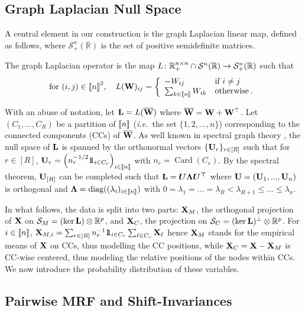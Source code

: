 \subsection{Graph Laplacian Null Space}\label{sec:laplacian_prop}
A central element in our construction is the graph Laplacian linear map, defined as follows, where $\mathcal{S}^n_+(\mathbb{R})$ is the set of positive semidefinite matrices.
\begin{definition}\label{graph_laplacian}
The graph Laplacian operator is the map $L \colon \mathbb{R}_+^{n \times n} \cap \mathcal{S}^n(\mathbb{R}) \to \mathcal{S}^n_+(\mathbb{R})$ such that
$$\text{for } (i,j) \in {[\![n]\!]}^2, \quad L(\mathbf{W})_{ij} = \left\{
\begin{array}{ll}
    - W_{ij} & \text{if } i \neq j \\
    \sum_{k \in {[\![n]\!]}} W_{ik} & \text{otherwise} \:.
\end{array} 
\right. $$
\end{definition}
With an abuse of notation, let $\mathbf{L} = L(\overline{\mathbf{W}})$ where $\overline{\mathbf{W}} = \mathbf{W} + \mathbf{W}^\top$. Let $(C_1,...,C_{R})$ be a partition of ${[\![n]\!]}$ (\textit{i.e.}\ the set $\{1,2,...,n\}$) corresponding to the connected components (CCs) of $\overline{\mathbf{W}}$. As well known in spectral graph theory \citep{Chung97}, the null space of $\mathbf{L}$ is spanned by the orthonormal vectors $\{\mathbf{U}_{r}\}_{r \in [R]}$ such that for $r \in [R]$,
$\mathbf{U}_{r} = \left(n_r^{-1/2} 1\!\!1_{i \in C_r}\right)_{i \in {[\![n]\!]}}$ with $n_r = \operatorname{Card}(C_r)$. By the spectral theorem, $\mathbf{U}_{[R]}$ can be completed such that $\mathbf{L} = \bm{U \Lambda U^\top}$ where $\mathbf{U} = (\mathbf{U}_1, ..., \mathbf{U}_n)$ is orthogonal and $\bm{\Lambda} = \operatorname{diag}((\lambda_i)_{i \in {[\![n]\!]}})$ with $0 = \lambda_1 = ... = \lambda_R < \lambda_{R+1} \leq ... \leq \lambda_n$. 

In what follows, the data is split into two parts: $\mathbf{X}_{M}$, the orthogonal projection of $\mathbf{X}$ on $\mathcal{S}_{M} = (\ker \mathbf{L}) \otimes \mathbb{R}^p$, and $\mathbf{X}_{C}$, the projection on $\mathcal{S}_{C} = (\ker \mathbf{L})^{\perp} \otimes \mathbb{R}^p$. For $i \in {[\![n]\!]}$, $\mathbf{X}_{M,i} = \sum_{r \in [R]} n_r^{-1} 1\!\!1_{i \in C_r}\sum_{\ell \in C_r} \mathbf{X}_{\ell} $ hence $\mathbf{X}_{M}$ stands for the empirical means of $\mathbf{X}$ on CCs, thus modelling the CC positions, while $\mathbf{X}_{C} = \mathbf{X} - \mathbf{X}_{M}$ is CC-wise centered, thus modeling the relative positions of the nodes within CCs. We now introduce the probability distribution of these variables.

\subsection{Pairwise MRF and Shift-Invariances}\label{sec:within_CC}

